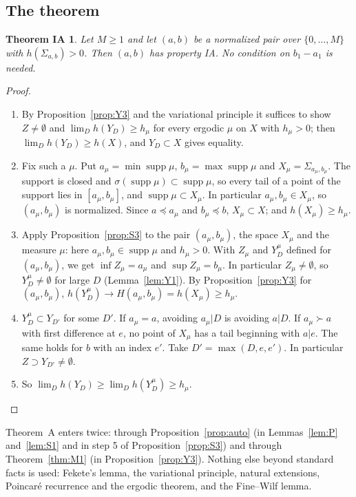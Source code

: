 \documentclass[11pt]{amsart}
\newtheorem*{thmIA}{Theorem IA}
\theoremstyle{definition}
\theoremstyle{remark}
\newcommand{\lex}{\preccurlyeq}
\begin{document}
\subsection{The theorem}

\begin{thmIA}
Let $M\ge1$ and let $(a,b)$ be a normalized pair over $\{0,\dots,M\}$ with $h(\Sigma_{a,b})>0$. Then $(a,b)$ has property IA. No condition on $b_1-a_1$ is needed.
\end{thmIA}

\begin{proof}
\begin{enumerate}
\item By Proposition~\ref{prop:Y3} and the variational principle it suffices to show $Z\ne\emptyset$ and $\lim_Dh(Y_D)\ge h_\mu$ for every ergodic $\mu$ on $X$ with $h_\mu>0$; then $\lim_Dh(Y_D)\ge h(X)$, and $Y_D\subset X$ gives equality.
\item Fix such a $\mu$. Put $a_\mu=\min\operatorname{supp}\mu$, $b_\mu=\max\operatorname{supp}\mu$ and $X_\mu=\Sigma_{a_\mu,b_\mu}$. The support is closed and $\sigma(\operatorname{supp}\mu)\subset\operatorname{supp}\mu$, so every tail of a point of the support lies in $[a_\mu,b_\mu]$, and $\operatorname{supp}\mu\subset X_\mu$. In particular $a_\mu,b_\mu\in X_\mu$, so $(a_\mu,b_\mu)$ is normalized. Since $a\lex a_\mu$ and $b_\mu\lex b$, $X_\mu\subset X$; and $h(X_\mu)\ge h_\mu$.
\item Apply Proposition~\ref{prop:S3} to the pair $(a_\mu,b_\mu)$, the space $X_\mu$ and the measure $\mu$: here $a_\mu,b_\mu\in\operatorname{supp}\mu$ and $h_\mu>0$. With $Z_\mu$ and $Y^\mu_D$ defined for $(a_\mu,b_\mu)$, we get $\inf Z_\mu=a_\mu$ and $\sup Z_\mu=b_\mu$. In particular $Z_\mu\ne\emptyset$, so $Y^\mu_D\ne\emptyset$ for large $D$ (Lemma~\ref{lem:Y1}). By Proposition~\ref{prop:Y3} for $(a_\mu,b_\mu)$, $h(Y^\mu_D)\to H(a_\mu,b_\mu)=h(X_\mu)\ge h_\mu$.
\item $Y^\mu_D\subset Y_{D'}$ for some $D'$. If $a_\mu=a$, avoiding $a_\mu|D$ is avoiding $a|D$. If $a_\mu\succ a$ with first difference at $e$, no point of $X_\mu$ has a tail beginning with $a|e$. The same holds for $b$ with an index $e'$. Take $D'=\max(D,e,e')$. In particular $Z\supset Y_{D'}\ne\emptyset$.
\item So $\lim_Dh(Y_D)\ge\lim_Dh(Y^\mu_D)\ge h_\mu$.
\end{enumerate}
\end{proof}

Theorem~A enters twice: through Proposition~\ref{prop:auto} (in Lemmas~\ref{lem:P} and~\ref{lem:S1} and in step 5 of Proposition~\ref{prop:S3}) and through Theorem~\ref{thm:M1} (in Proposition~\ref{prop:Y3}). Nothing else beyond standard facts is used: Fekete's lemma, the variational principle, natural extensions, Poincar\'e recurrence and the ergodic theorem, and the Fine--Wilf lemma.
\end{document}

